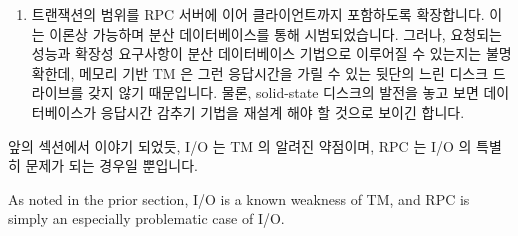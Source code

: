 \begin{enumerate}

\item	트랜잭션의 범위를 RPC 서버에 이어 클라이언트까지 포함하도록 확장합니다.
	이는 이론상 가능하며 분산 데이터베이스를 통해 시범되었습니다.
	그러나, 요청되는 성능과 확장성 요구사항이 분산 데이터베이스 기법으로
	이루어질 수 있는지는 불명확한데, 메모리 기반 TM 은 그런 응답시간을 가릴
	수 있는 뒷단의 느린 디스크 드라이브를 갖지 않기 때문입니다.
	물론, solid-state 디스크의 발전을 놓고 보면 데이터베이스가 응답시간
	감추기 기법을 재설계 해야 할 것으로 보이긴 합니다.

\end{enumerate}

앞의 섹션에서 이야기 되었듯, I/O 는 TM 의 알려진 약점이며, RPC 는 I/O 의 특별히
문제가 되는 경우일 뿐입니다.

\iffalse

As noted in the prior section, I/O is a known weakness of TM, and RPC
is simply an especially problematic case of I/O.

